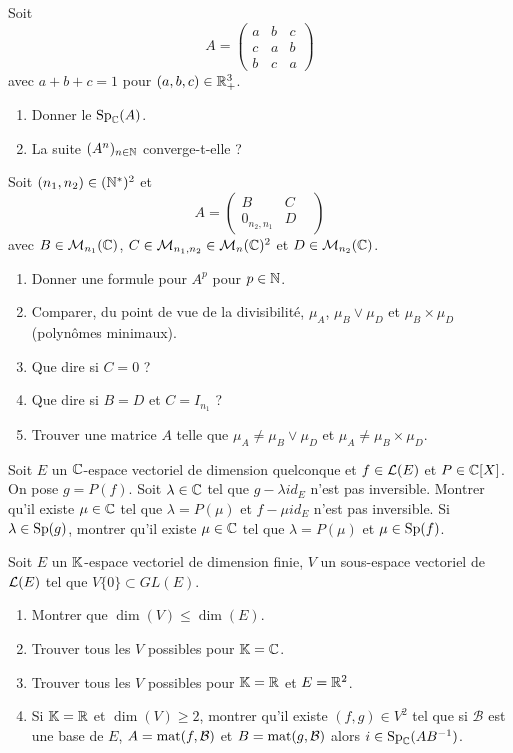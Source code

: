 \begin{exercise}
	Soit 
	$$
	A=
	\begin{pmatrix}
		a & b & c\\
		c & a & b\\
		b & c & a
	\end{pmatrix}
	$$
	avec $a+b+c=1$ pour $(a,b,c)\in\mathbb{R}_{+}^{3}$.
	\begin{enumerate}
		\item Donner le $\operatorname{Sp}_{\mathbb{C}}(A)$.
		\item La suite $(A^{n})_{n\in\mathbb{N}}$ converge-t-elle ?
	\end{enumerate}
\end{exercise}

\begin{exercise}
	Soit $(n_{1},n_{2})\in(\mathbb{N}^{*})^{2}$ et
	$$
	A=
	\begin{pmatrix}
		B & C &\\
		0_{n_{2},n_{1}} & D
	\end{pmatrix}
	$$
	avec $B\in\mathcal{M}_{n_{1}}(\mathbb{C})$, $C\in\mathcal{M}_{n_{1},n_{2}}\in\mathcal{M}_{n}(\mathbb{C})^{2}$ et $D\in\mathcal{M}_{n_{2}}(\mathbb{C})$.
	\begin{enumerate}
		\item Donner une formule pour $A^{p}$ pour $p\in\mathbb{N}$.
		\item Comparer, du point de vue de la divisibilité, $\mu_{A}$, $\mu_{B}\vee\mu_{D}$ et $\mu_{B}\times\mu_{D}$ (polynômes minimaux).
		\item Que dire si $C=0$ ?
		\item Que dire si $B=D$ et $C=I_{n_{1}}$ ?
		\item Trouver une matrice $A$ telle que $\mu_{A}\neq \mu_{B}\vee\mu_{D}$ et $\mu_{A}\neq \mu_{B}\times\mu_{D}$.
	\end{enumerate}
\end{exercise}

\begin{exercise}
	Soit $E$ un $\mathbb{C}$-espace vectoriel de dimension quelconque et $f\in\mathcal{L}(E)$ et $P\in\mathbb{C}[X]$. On pose $g=P(f)$. Soit $\lambda\in\mathbb{C}$ tel que $g-\lambda id_{E}$ n'est pas inversible. Montrer qu'il existe $\mu\in\mathbb{C}$ tel que $\lambda=P(\mu)$ et $f-\mu id_{E}$ n'est pas inversible. Si $\lambda\in\operatorname{Sp}(g)$, montrer qu'il existe $\mu\in\mathbb{C}$ tel que $\lambda=P(\mu)$ et $\mu\in\operatorname{Sp}(f)$.
\end{exercise}

\begin{exercise}
	Soit $E$ un $\mathbb{K}$-espace vectoriel de dimension finie, $V$ un sous-espace vectoriel de $\mathcal{L}(E)$ tel que $V\{0\}\subset GL(E)$.
	\begin{enumerate}
		\item Montrer que $\dim(V)\leqslant\dim(E)$.
		\item Trouver tous les $V$ possibles pour $\mathbb{K}=\mathbb{C}$.
		\item Trouver tous les $V$ possibles pour $\mathbb{K}=\mathbb{R}$ et $E=\mathbb{R}^{2}$.
		\item Si $\mathbb{K}=\mathbb{R}$ et $\dim(V)\geqslant2$, montrer qu'il existe $(f,g)\in V^{2}$ tel que si $\mathcal{B}$ est une base de $E$, $A=\operatorname{mat}(f,\mathcal{B})$ et $B=\operatorname{mat}(g,\mathcal{B})$ alors $i\in\operatorname{Sp}_{\mathbb{C}}(AB^{-1})$.
	\end{enumerate}
\end{exercise}

